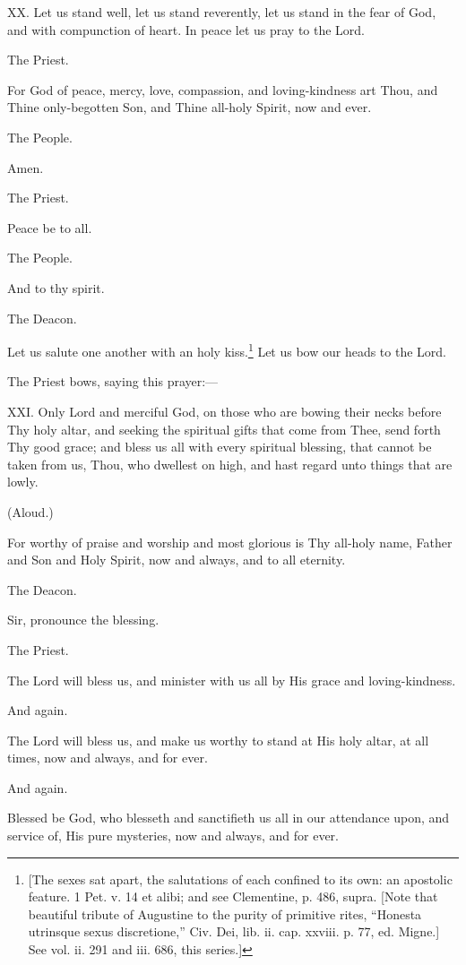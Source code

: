 XX. Let us stand well, let us stand reverently, let us stand in the fear of God, and with compunction of heart. In peace let us pray to the Lord.

The Priest.

For God of peace, mercy, love, compassion, and loving-kindness art Thou, and Thine only-begotten Son, and Thine all-holy Spirit, now and ever.

The People.

Amen.

The Priest.

Peace be to all.

The People.

And to thy spirit.

The Deacon.

Let us salute one another with an holy kiss.\footnote{\par{}  [The sexes sat apart, the salutations of each confined to its own: an apostolic feature. 1 Pet. v. 14 et alibi; and see Clementine, p. 486, supra. [Note that beautiful tribute of Augustine to the purity of primitive rites, “Honesta utrinsque sexus discretione,” Civ. Dei, lib. ii. cap. xxviii. p. 77, ed. Migne.] See vol. ii. 291 and iii. 686, this series.]} Let us bow our heads to the Lord.

The Priest bows, saying this prayer:—

XXI. Only Lord and merciful God, on those who are bowing their necks before Thy holy altar, and seeking the spiritual gifts that come from Thee, send forth Thy good grace; and bless us all with every spiritual blessing, that cannot be taken from us, Thou, who dwellest on high, and hast regard unto things that are lowly.

(Aloud.)

For worthy of praise and worship and most glorious is Thy all-holy name, Father and Son and Holy Spirit, now and always, and to all eternity.

The Deacon.

Sir, pronounce the blessing.

The Priest.

The Lord will bless us, and minister with us all by His grace and loving-kindness.

And again.

The Lord will bless us, and make us worthy to stand at His holy altar, at all times, now and always, and for ever.

And again.

Blessed be God, who blesseth and sanctifieth us all in our attendance upon, and service of, His pure mysteries, now and always, and for ever.


